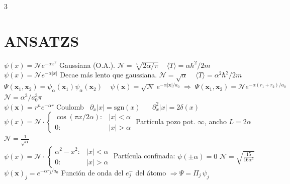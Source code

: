 \documentclass[8pt,a4paper,fleqn]{extarticle} %
\begin{document}
\begin{multicols}{3}
\section{ANSATZS}
$\psi (x) = \mathcal{N} e^{-\alpha x^2}$ Gaussiana (O.A.). $\mathcal{N} = \sqrt[4]{2\alpha/\pi}\; \;\;\; \langle T \rangle = \alpha \hbar^2 /2m$\\
$\psi(x) = \mathcal{N} e^{-\alpha |x|}$ Decae más lento que gaussiana.  $\mathcal{N} = \sqrt{\alpha}\;\;\;\; \langle T \rangle = \alpha^2 \hbar^2 /2m$
\\
$\Psi (\mathbf{x}_1, \mathbf{x}_2) = \psi_\alpha (\mathbf{x}_1) \psi_\alpha (\mathbf{x}_2)\; \;\;\; \psi(\mathbf{x})=\sqrt{\mathcal{N}}\, e^{-\alpha |\mathbf{x}| /a_0}\;  \Rightarrow \; \Psi(\mathbf{x}_1, \mathbf{x}_2) = \mathcal{N} e^{-\alpha(r_1+r_2)/a_0}$\\
$\mathcal{N} =\alpha^3/a_0^3 \pi$
\\
$\psi (\mathbf{x}) = r^n e^{-\alpha r}$ Coulomb \;\;\;\;\,\; $\partial_x|x| = \mathrm{sgn}(x)\;\;\;\;\;\; \partial_x ^2|x| = 2\delta(x)$
\\
$\psi (x)= \mathcal{N}\cdot\begin{cases}
    \cos(\pi x / 2\alpha):&  |x| < \alpha\\
    0: & |x| > \alpha
\end{cases}$ Partícula pozo pot. $\infty$, ancho $L = 2\alpha$ $\mathcal{N} = \frac{1}{\sqrt{\alpha}}$\\
$\psi (x)= \mathcal{N}\cdot\begin{cases}
    \alpha^2 - x^2:&  |x| < \alpha\\
    0: & |x| > \alpha
\end{cases}$ Partícula confinada: $\psi (\pm \alpha) = 0$ \; $\mathcal{N} = \sqrt{\frac{15}{16\alpha^5}}$\\
$\psi(\mathbf{x})_j = e^{- \alpha r_j/a_0} 
$ Función de onda del $e^-_j$ del átomo $\Rightarrow \Psi = \Pi_j \,\psi_j$


\end{multicols}
\end{document}

